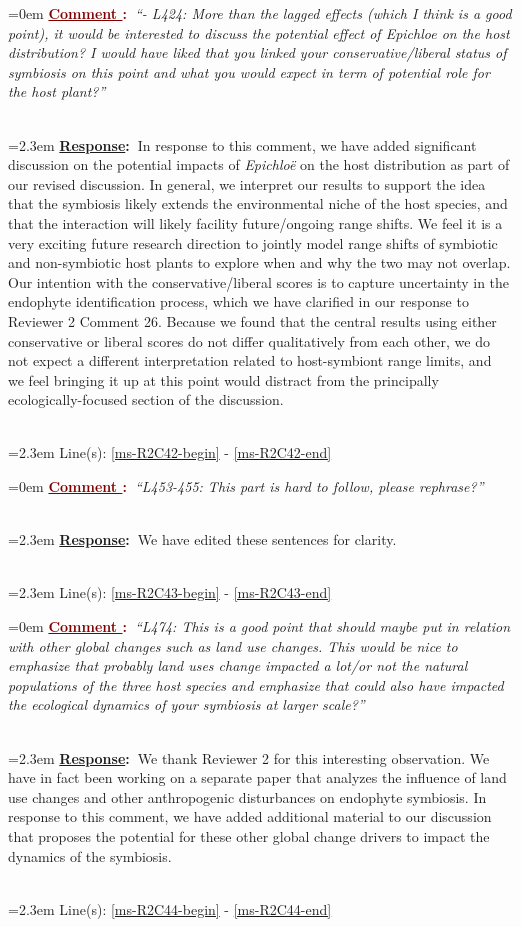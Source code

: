 \documentclass[12pt]{article}
\newcounter{cN}
\newcommand{\comment}[1]{
	\vspace{2em}
	\refstepcounter{cN} %
	\noindent \hangindent=0em \textbf{\textcolor{Maroon}{\uline{Comment \thecN}:~}}\emph{``#1''}
	}
\newcommand{\response}[1]{
	\\[0.25em]
	\hangindent=2.3em \textbf{\textcolor{NavyBlue}{\uline{Response}:~}}#1
	}
\newcommand{\linesref}[2]{
		\\[0.25em]
	\hangindent=2.3em {\color{Mahogany} Line(s): \ref{#1} - \ref{#2}}
}
\begin{document}
\comment{- L424: More than the lagged effects (which I think is a good point), it would be interested to discuss the potential effect of Epichloe on the host distribution? I would have liked that you linked your conservative/liberal status of symbiosis on this point and what you would expect in term of potential role for the host plant?}
\response{In response to this comment, we have added significant discussion on the potential impacts of \emph{Epichloë} on the host distribution as part of our revised discussion. In general, we interpret our results to support the idea that the symbiosis likely extends the environmental niche of the host species, and that the interaction will likely facility future/ongoing range shifts. We feel it is a very exciting future research direction to jointly model range shifts of symbiotic and non-symbiotic host plants to explore when and why the two may not overlap.
	\\
 
Our intention with the conservative/liberal scores is to capture uncertainty in the endophyte identification process, which we have clarified in our response to Reviewer 2 Comment 26. Because we found that the central results using either conservative or liberal scores do not differ qualitatively from each other, we do not expect a different interpretation related to host-symbiont range limits, and we feel bringing it up at this point would distract from the principally ecologically-focused section of the discussion.}
\linesref{ms-R2C42-begin}{ms-R2C42-end}



\comment{L453-455: This part is hard to follow, please rephrase?}
\response{We have edited these sentences for clarity.}
\linesref{ms-R2C43-begin}{ms-R2C43-end}

\comment{L474: This is a good point that should maybe put in relation with other global changes such as land use changes. This would be nice to emphasize that probably land uses change impacted a lot/or not the natural populations of the three host species and emphasize that could also have impacted the ecological dynamics of your symbiosis at larger scale?}
\response{We thank Reviewer 2 for this interesting observation. We have in fact been working on a separate paper that analyzes the influence of land use changes and other anthropogenic disturbances on endophyte symbiosis. In response to this comment, we have added additional material to our discussion that proposes the potential for these other global change drivers to impact the dynamics of the symbiosis.}
\linesref{ms-R2C44-begin}{ms-R2C44-end}
\end{document}
